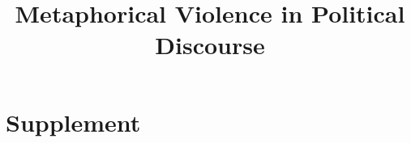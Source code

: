 \documentclass[11pt,letterpaper]{article}
\title{Metaphorical Violence in Political Discourse}
\author{}
\date{}
\begin{document}
\maketitle



% 

\clearpage

% 

% 



\clearpage

% 

\clearpage

\section{Supplement}

\end{document}
